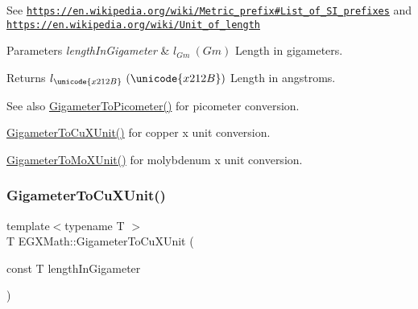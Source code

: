 See \href{https://en.wikipedia.org/wiki/Metric_prefix#List_of_SI_prefixes}{\tt https\+://en.\+wikipedia.\+org/wiki/\+Metric\+\_\+prefix\#\+List\+\_\+of\+\_\+\+S\+I\+\_\+prefixes} and \href{https://en.wikipedia.org/wiki/Unit_of_length}{\tt https\+://en.\+wikipedia.\+org/wiki/\+Unit\+\_\+of\+\_\+length} 
\begin{DoxyParams}{Parameters}
{\em length\+In\+Gigameter} & $ l_{Gm}\ (Gm)$ Length in gigameters. \\
\hline
\end{DoxyParams}
\begin{DoxyReturn}{Returns}
$ l_{\unicode{x212B}}\ (\unicode{x212B})$ Length in angstroms. 
\end{DoxyReturn}
\begin{DoxySeeAlso}{See also}
\mbox{\hyperlink{group___e_g_x_math-_conversions-_length_conversions-_s_i-_gigameter-_s_i_gae9cea35a0ce747d02ec8b6cf7bfeaa7e}{Gigameter\+To\+Picometer()}} for picometer conversion. 

\mbox{\hyperlink{group___e_g_x_math-_conversions-_length_conversions-_s_i-_gigameter-_non-_s_i_gab542297b31676ef5b3cf62f0c63a6f20}{Gigameter\+To\+Cu\+X\+Unit()}} for copper x unit conversion. 

\mbox{\hyperlink{group___e_g_x_math-_conversions-_length_conversions-_s_i-_gigameter-_non-_s_i_gac30ae06633de77b05d859ffb3cd2a577}{Gigameter\+To\+Mo\+X\+Unit()}} for molybdenum x unit conversion. 
\end{DoxySeeAlso}
\mbox{\label{group___e_g_x_math-_conversions-_length_conversions-_s_i-_gigameter-_non-_s_i_gab542297b31676ef5b3cf62f0c63a6f20}} 
\subsubsection{\texorpdfstring{Gigameter\+To\+Cu\+X\+Unit()}{GigameterToCuXUnit()}}
{\footnotesize\ttfamily template$<$typename T $>$ \\
T E\+G\+X\+Math\+::\+Gigameter\+To\+Cu\+X\+Unit (\begin{DoxyParamCaption}\item[{const T}]{length\+In\+Gigameter }\end{DoxyParamCaption})}



